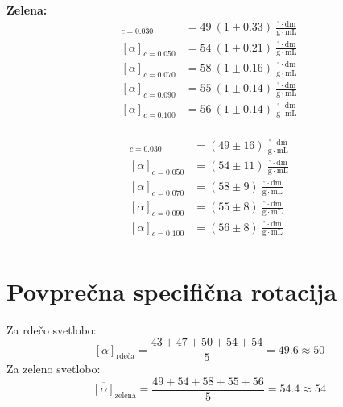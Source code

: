 \documentclass[20pt]{extarticle}
\begin{document}
\vspace{1em}

\begin{minipage}{0.48\textwidth}
\textbf{Zelena:}
\begin{align*}
[\alpha]_{c=0.030} &= 49 \ (1 \pm 0.33) \ \frac{^\circ \cdot \mathrm{dm}}{\mathrm{g} \cdot \mathrm{mL}} \\
[\alpha]_{c=0.050} &= 54 \ (1 \pm 0.21) \ \frac{^\circ \cdot \mathrm{dm}}{\mathrm{g} \cdot \mathrm{mL}} \\
[\alpha]_{c=0.070} &= 58 \ (1 \pm 0.16) \ \frac{^\circ \cdot \mathrm{dm}}{\mathrm{g} \cdot \mathrm{mL}} \\
[\alpha]_{c=0.090} &= 55 \ (1 \pm 0.14) \ \frac{^\circ \cdot \mathrm{dm}}{\mathrm{g} \cdot \mathrm{mL}} \\
[\alpha]_{c=0.100} &= 56 \ (1 \pm 0.14) \ \frac{^\circ \cdot \mathrm{dm}}{\mathrm{g} \cdot \mathrm{mL}} \\
\end{align*}
\end{minipage}
\hfill
\begin{minipage}{0.48\textwidth}

\begin{align*}
[\alpha]_{c=0.030} &= (49 \pm 16) \  \frac{^\circ \cdot \mathrm{dm}}{\mathrm{g} \cdot \mathrm{mL}} \\
[\alpha]_{c=0.050} &= (54 \pm 11) \  \frac{^\circ \cdot \mathrm{dm}}{\mathrm{g} \cdot \mathrm{mL}} \\
[\alpha]_{c=0.070} &= (58 \pm 9)  \ \frac{^\circ \cdot \mathrm{dm}}{\mathrm{g} \cdot \mathrm{mL}} \\
[\alpha]_{c=0.090} &= (55 \pm 8)  \ \frac{^\circ \cdot \mathrm{dm}}{\mathrm{g} \cdot \mathrm{mL}} \\
[\alpha]_{c=0.100} &= (56 \pm 8)  \ \frac{^\circ \cdot \mathrm{dm}}{\mathrm{g} \cdot \mathrm{mL}} \\
\end{align*}
\end{minipage}


\section*{Povprečna specifična rotacija}

Za rdečo svetlobo:
\[
\overline{[\alpha]}_{\text{rdeča}} = \frac{43 + 47 + 50 + 54 + 54}{5} = 49.6 \approx 50
\]
Za zeleno svetlobo:
\[
\overline{[\alpha]}_{\text{zelena}} = \frac{49 + 54 + 58 + 55 + 56}{5} = 54.4 \approx 54
\]
\end{document}
